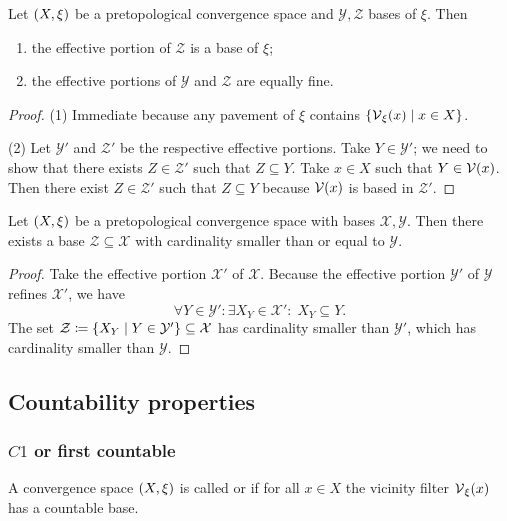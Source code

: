 \begin{lemma}
Let $\left( X,\xi \right)$ be a pretopological convergence space and $\mathcal{Y}, \mathcal{Z}$ bases of $\xi$. Then
\begin{enumerate}
\item the effective portion of $\mathcal{Z}$ is a base of $\xi$;
\item the effective portions of $\mathcal{Y}$ and $\mathcal{Z}$ are equally fine.
\end{enumerate}
\end{lemma}
\begin{proof}
(1) Immediate because any pavement of $\xi$ contains $\setbuilder{\vicinity_\xi(x)}{x\in X}$.

(2) Let $\mathcal{Y}'$ and $\mathcal{Z}'$ be the respective effective portions. Take $Y\in \mathcal{Y}'$; we need to show that there exists $Z\in \mathcal{Z}'$ such that $Z\subseteq Y$. Take $x\in X$ such that $Y\in \operatorname{\mathcal{V}}(x)$. Then there exist $Z \in \mathcal{Z}'$ such that $Z\subseteq Y$ because $\operatorname{\mathcal{V}}(x)$ is based in $\mathcal{Z}'$. 
\end{proof}
\begin{corollary} \label{cardinalityPretopologicalBase}
Let $\left( X,\xi \right)$ be a pretopological convergence space with bases $\mathcal{X},\mathcal{Y}$. Then there exists a base $\mathcal{Z} \subseteq \mathcal{X}$ with cardinality smaller than or equal to $\mathcal{Y}$.
\end{corollary}
\begin{proof}
Take the effective portion $\mathcal{X}'$ of $\mathcal{X}$. Because the effective portion $\mathcal{Y}'$ of $\mathcal{Y}$ refines $\mathcal{X}'$, we have
\[ \forall Y\in \mathcal{Y}': \exists X_Y \in \mathcal{X}': \; X_Y\subseteq Y. \]
The set $\mathcal{Z} \defeq \setbuilder{X_Y}{Y\in \mathcal{Y}'} \subseteq \mathcal{X}$ has cardinality smaller than $\mathcal{Y}'$, which has cardinality smaller than $\mathcal{Y}$.
\end{proof}

\subsection{Countability properties}
\subsubsection{$C1$ or first countable}
\begin{definition}
A convergence space $\left( X, \xi \right)$ is called  or  if for all $x\in X$ the vicinity filter $\operatorname{\mathcal{V}}_\xi(x)$ has a countable base.
\end{definition}

